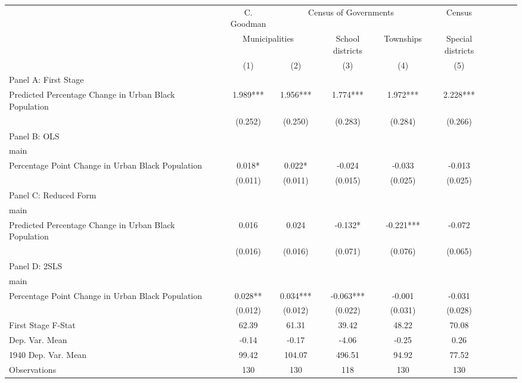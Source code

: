  \begin{tabular}{l*{8}{c}} \toprule
&\multicolumn{1}{c}{C. Goodman}&\multicolumn{3}{c}{Census of Governments}&\multicolumn{1}{c}{Census}\\\cmidrule(lr){2-2}\cmidrule(lr){3-5}\cmidrule(lr){6-6}
&\multicolumn{2}{c}{Municipalities}&\multicolumn{1}{c}{School districts}&\multicolumn{1}{c}{Townships}&\multicolumn{1}{c}{Special districts}&\\\cmidrule(lr){2-3}\cmidrule(lr){4-5}\cmidrule(lr){6-6}
&\multicolumn{1}{c}{(1)}&\multicolumn{1}{c}{(2)}&\multicolumn{1}{c}{(3)}&\multicolumn{1}{c}{(4)}&\multicolumn{1}{c}{(5)}\\
\cmidrule(lr){1-6}
\multicolumn{5}{l}{Panel A: First Stage}\\
\cmidrule(lr){1-6}
Predicted Percentage Change in Urban Black Population&    1.989***&    1.956***&    1.774***&    1.972***&    2.228***\\
                &  (0.252)   &  (0.250)   &  (0.283)   &  (0.284)   &  (0.266)   \\
\cmidrule(lr){1-6}
\multicolumn{5}{l}{Panel B: OLS}\\
\cmidrule(lr){1-6}
main            &            &            &            &            &            \\
Percentage Point Change in Urban Black Population&    0.018*  &    0.022*  &   -0.024   &   -0.033   &   -0.013   \\
                &  (0.011)   &  (0.011)   &  (0.015)   &  (0.025)   &  (0.025)   \\
\cmidrule(lr){1-6}
\multicolumn{5}{l}{Panel C: Reduced Form}\\
\cmidrule(lr){1-6}
main            &            &            &            &            &            \\
Predicted Percentage Change in Urban Black Population&    0.016   &    0.024   &   -0.132*  &   -0.221***&   -0.072   \\
                &  (0.016)   &  (0.016)   &  (0.071)   &  (0.076)   &  (0.065)   \\
\cmidrule(lr){1-6}
\multicolumn{5}{l}{Panel D: 2SLS}\\
\cmidrule(lr){1-6}
main            &            &            &            &            &            \\
Percentage Point Change in Urban Black Population&    0.028** &    0.034***&   -0.063***&   -0.001   &   -0.031   \\
                &  (0.012)   &  (0.012)   &  (0.022)   &  (0.031)   &  (0.028)   \\
\midrule
First Stage F-Stat&    62.39   &    61.31   &    39.42   &    48.22   &    70.08   \\
Dep. Var. Mean  &    -0.14   &    -0.17   &    -4.06   &    -0.25   &     0.26   \\
1940 Dep. Var. Mean&    99.42   &   104.07   &   496.51   &    94.92   &    77.52   \\
Observations    &      130   &      130   &      118   &      130   &      130   \\
 \bottomrule \end{tabular}
